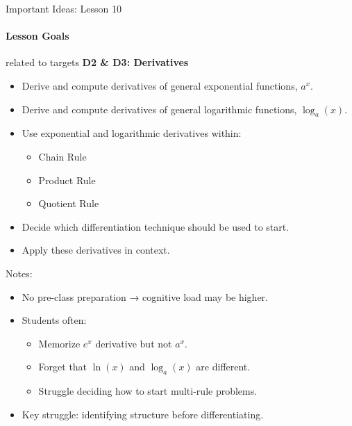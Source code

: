 \documentclass{beamer}
\begin{document}
\begin{frame}{Important Ideas: Lesson 10}
\paragraph{Lesson Goals} related to targets {\bf\color{ProcessBlue} D2 \& D3: Derivatives}

\begin{itemize}
    \item Derive and compute derivatives of general exponential functions, $a^x$.
    \item Derive and compute derivatives of general logarithmic functions, $\log_a(x)$.
    \item Use exponential and logarithmic derivatives within:
    \begin{itemize}
        \item Chain Rule
        \item Product Rule
        \item Quotient Rule
    \end{itemize}
    \item Decide which differentiation technique should be used to start.
    \item Apply these derivatives in context.
\end{itemize}
\end{frame}

\begin{frame}{Notes:}
\begin{itemize}
    \item No pre-class preparation → cognitive load may be higher.
    \item Students often:
    \begin{itemize}
        \item Memorize $e^x$ derivative but not $a^x$.
        \item Forget that $\ln(x)$ and $\log_a(x)$ are different.
        \item Struggle deciding how to start multi-rule problems.
    \end{itemize}
    \item Key struggle: identifying structure before differentiating.
\end{itemize}
\end{frame}
\end{document}
